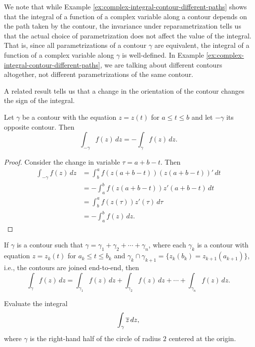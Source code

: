 We note that while Example \ref{ex:complex-integral-contour-different-paths}
shows that the integral of a function of a complex variable along a contour
depends on the path taken by the contour, the invariance under reparametrization
tells us that the actual choice of parametrization does not affect the value of
the integral. That is, since all parametrizations of a contour \(\gamma\) are
equivalent, the integral of a function of a complex variable along \(\gamma\) is
well-defined. In Example \ref{ex:complex-integral-contour-different-paths}, we
are talking about different contours altogether, not different parametrizations
of the same contour.

A related result tells us that a change in the orientation of the contour
changes the sign of the integral.

\begin{theorem}
    Let \(\gamma\) be a contour with the equation \(z = z(t)\) for \(a \leq t
    \leq b\) and let \(-\gamma\) its opposite contour. Then
    \[
        \int_{-\gamma} f(z) \, dz = -\int_\gamma f(z) \, dz.
    \]
    \label{thm:opposite-contour}
\end{theorem}

\begin{proof}
    Consider the change in variable \(\tau = a + b - t\). Then
    \begin{align*}
        \int_{-\gamma} f(z) \, dz &= \int_{b}^{a} f(z(a + b - t)) (z(a + b - t))' \, dt \\
        &= -\int_{a}^{b} f(z(a + b - t)) z'(a + b - t) \, dt \\
        &= \int_b^a f(z(\tau)) z'(\tau) \, d\tau \\
        &= -\int_a^b f(z) \, dz.
    \end{align*}
\end{proof}

\begin{theorem}
    If \(\gamma\) is a contour such that \(\gamma = \gamma_1 + \gamma_2 + \cdots + \gamma_n\), where each \(\gamma_k\) is a contour with equation \(z = z_k(t)\) for \(a_k \leq t \leq b_k\) and \(\gamma_k \cap \gamma_{k+1} = \{z_k(b_k) = z_{k+1}(a_{k+1})\}\), i.e., the contours are joined end-to-end, then
    \[
        \int_\gamma f(z) \, dz = \int_{\gamma_1} f(z) \, dz + \int_{\gamma_2} f(z) \, dz + \cdots + \int_{\gamma_n} f(z) \, dz.
    \]
\end{theorem}

\begin{example}
    Evaluate the integral
    \[
        \int_{\gamma} \overline{z} \, dz,
    \]
    where \(\gamma\) is the right-hand half of the circle of radius \(2\)
    centered at the origin.
\end{example}

